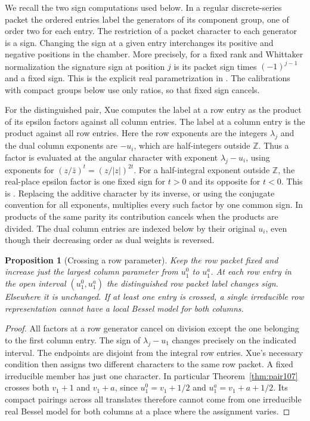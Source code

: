 \documentclass[a4paper,11pt]{article}
\newtheorem{proposition}{Proposition}[section]
\theoremstyle{definition}
\theoremstyle{remark}
\newcommand{\ZZ}{\mathbb Z}\newcommand{\ord}{\operatorname{ord}}
\numberwithin{equation}{section}
\begin{document}
We recall the two sign computations used below. In a regular
discrete-series packet the ordered entries label the generators
of its component group, one of order two for each entry. The
restriction of a packet character to each generator is a sign.
Changing the sign at a given entry interchanges its positive and
negative positions in the chamber. More precisely, for a fixed
rank and Whittaker normalization the signature sign at position
\(j\) is its packet sign times \((-1)^{j-1}\) and a fixed sign.
This is the explicit real parametrization in
\cite[Appendix A]{XVII-XII-I-atobe108}. The calibrations with compact
groups below use only ratios, so that fixed sign cancels.

For the distinguished pair, Xue computes the label at a row
entry as the product of its epsilon factors against all column
entries. The label at a column entry is the product against all
row entries. Here the row exponents are the integers \(\lambda_j\)
and the dual column exponents are \(-u_i\), which are half-integers
outside \(\ZZ\). Thus a factor is evaluated at the angular
character with exponent \(\lambda_j-u_i\), using exponents for
\((z/\bar z)^t=(z/|z|)^{2t}\). For a half-integral exponent
outside \(\ZZ\), the real-place epsilon factor is one fixed sign
for \(t>0\) and its opposite for \(t<0\). This is
\cite[Proposition 2.1 and Corollary 2.2]{XVII-XII-I-ggp108}. Replacing the
additive character by its inverse, or using the conjugate
convention for all exponents, multiplies every such factor by
one common sign. In products of the same parity its contribution
cancels when the products are divided. The dual column entries
are indexed below by their original \(u_i\), even though their
decreasing order as dual weights is reversed.

\begin{proposition}[Crossing a row parameter]\label{prop:cross108}
Keep the row packet fixed and increase just the largest column
parameter from \(u_1^0\) to \(u_1^a\). At each row entry in the
open interval \((u_1^0,u_1^a)\) the distinguished row packet
label changes sign. Elsewhere it is unchanged. If at least one
entry is crossed, a single irreducible row representation cannot
have a local Bessel model for both columns.
\end{proposition}
\begin{proof}
All factors at a row generator cancel on division except the
one belonging to the first column entry. The sign of
\(\lambda_j-u_1\) changes precisely on the indicated interval.
The endpoints are disjoint from the integral row entries.
Xue's necessary condition then assigns two different characters
to the same row packet. A fixed irreducible member has just one
character. In particular Theorem~\ref{thm:pair107} crosses both
\(v_1+1\) and \(v_1+a\), since \(u_1^0=v_1+1/2\) and
\(u_1^a=v_1+a+1/2\). Its compact pairings across all translates
therefore cannot come from one irreducible real Bessel model
for both columns at a place where the assignment varies.
\end{proof}
\end{document}

